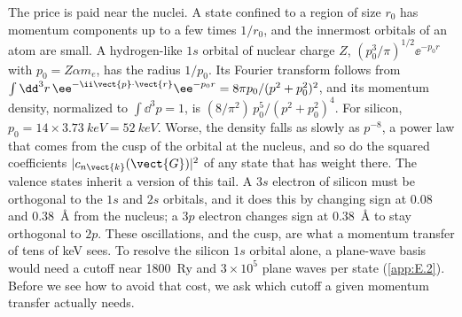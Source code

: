 The price is paid near the nuclei. A state confined to a region of size $r_0$ has momentum components up to a few times $1/r_0$, and the innermost orbitals of an atom are small. A hydrogen-like $1s$ orbital of nuclear charge $Z$, $(p_0^3/\pi)^{1/2}\ee^{-p_0r}$ with $p_0 = Z\alpha m_e$, has the radius $1/p_0$. Its Fourier transform follows from $\int\dd^3r\,\ee^{-\ii\vect{p}\cdot\vect{r}}\ee^{-p_0r} = 8\pi p_0/(p^2 + p_0^2)^2$, and its momentum density, normalized to $\int\dd^3p = 1$, is $(8/\pi^2)\,p_0^5/(p^2 + p_0^2)^4$. For silicon, $p_0 = 14\times\SI{3.73}{keV} = \SI{52}{keV}$. Worse, the density falls as slowly as $p^{-8}$, a power law that comes from the cusp of the orbital at the nucleus, and so do the squared coefficients $|c_{n\vect{k}}(\vect{G})|^2$ of any state that has weight there. The valence states inherit a version of this tail. A $3s$ electron of silicon must be orthogonal to the $1s$ and $2s$ orbitals, and it does this by changing sign at 0.08 and \SI{0.38}{\angstrom} from the nucleus; a $3p$ electron changes sign at \SI{0.38}{\angstrom} to stay orthogonal to $2p$. These oscillations, and the cusp, are what a momentum transfer of tens of keV sees. To resolve the silicon $1s$ orbital alone, a plane-wave basis would need a cutoff near \SI{1800}{Ry} and $3\times10^5$ plane waves per state (\cref{app:E.2}). Before we see how to avoid that cost, we ask which cutoff a given momentum transfer actually needs.

